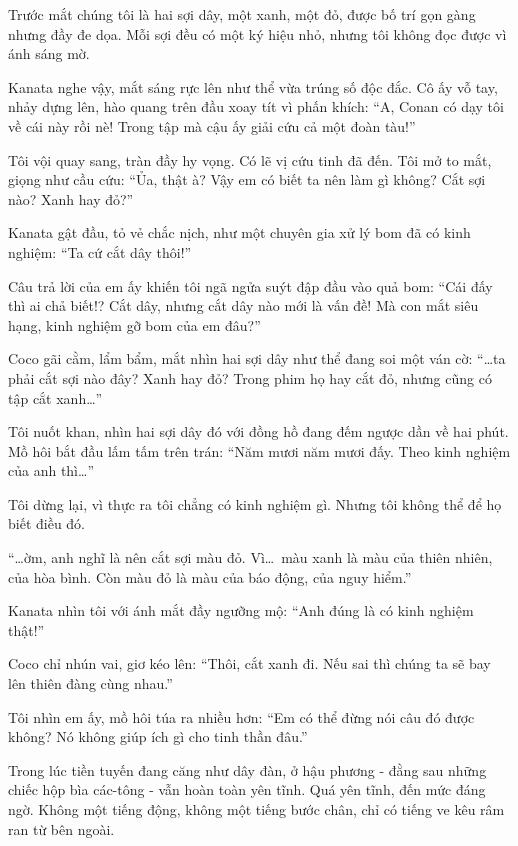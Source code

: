 \documentclass[../main.tex]{subfiles}
\begin{document}
Trước mắt chúng tôi là hai sợi dây, một xanh, một đỏ, được bố trí gọn gàng nhưng đầy đe dọa. Mỗi sợi đều có một ký hiệu nhỏ, nhưng tôi không đọc được vì ánh sáng mờ.

Kanata nghe vậy, mắt sáng rực lên như thể vừa trúng số độc đắc. Cô ấy vỗ tay, nhảy dựng lên, hào quang trên đầu xoay tít vì phấn khích: ``A, Conan có dạy tôi về cái này rồi nè! Trong tập mà cậu ấy giải cứu cả một đoàn tàu!''


Tôi vội quay sang, tràn đầy hy vọng. Có lẽ vị cứu tinh đã đến. Tôi mở to mắt, giọng như cầu cứu: ``Ủa, thật à? Vậy em có biết ta nên làm gì không? Cắt sợi nào? Xanh hay đỏ?''

Kanata gật đầu, tỏ vẻ chắc nịch, như một chuyên gia xử lý bom đã có kinh nghiệm: ``Ta cứ cắt dây thôi!''

Câu trả lời của em ấy khiến tôi ngã ngửa suýt đập đầu vào quả bom: ``Cái đấy thì ai chả biết!? Cắt dây, nhưng cắt dây nào mới là vấn đề! Mà con mắt siêu hạng, kinh nghiệm gỡ bom của em đâu?''

Coco gãi cằm, lẩm bẩm, mắt nhìn hai sợi dây như thể đang soi một ván cờ: ``\dots ta phải cắt sợi nào đây? Xanh hay đỏ? Trong phim họ hay cắt đỏ, nhưng cũng có tập cắt xanh\dots''

Tôi nuốt khan, nhìn hai sợi dây đó với đồng hồ đang đếm ngược dần về hai phút. Mồ hôi bắt đầu lấm tấm trên trán: ``Năm mươi năm mươi đấy. Theo kinh nghiệm của anh thì\dots''

Tôi dừng lại, vì thực ra tôi chẳng có kinh nghiệm gì. Nhưng tôi không thể để họ biết điều đó.

``\dots ờm, anh nghĩ là nên cắt sợi màu đỏ. Vì\dots\ màu xanh là màu của thiên nhiên, của hòa bình. Còn màu đỏ là màu của báo động, của nguy hiểm.''

Kanata nhìn tôi với ánh mắt đầy ngưỡng mộ: ``Anh đúng là có kinh nghiệm thật!''

Coco chỉ nhún vai, giơ kéo lên: ``Thôi, cắt xanh đi. Nếu sai thì chúng ta sẽ bay lên thiên đàng cùng nhau.''

Tôi nhìn em ấy, mồ hôi túa ra nhiều hơn: ``Em có thể đừng nói câu đó được không? Nó không giúp ích gì cho tinh thần đâu.''

\ct

\pov{-}

Trong lúc tiền tuyến đang căng như dây đàn, ở hậu phương - đằng sau những chiếc hộp bìa các-tông - vẫn hoàn toàn yên tĩnh. Quá yên tĩnh, đến mức đáng ngờ. Không một tiếng động, không một tiếng bước chân, chỉ có tiếng ve kêu râm ran từ bên ngoài.
\end{document}
